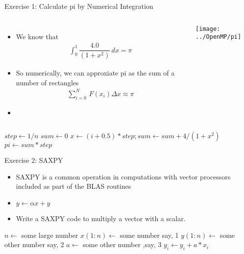 \documentclass[c,mathserif,compress,xcolor=svgnames]{beamer}
\begin{document}
\setcounter{algorithm}{0}
\begin{frame}[allowframebreaks]{Exercise 1: Calculate pi by Numerical Integration}
  \begin{columns}
    \column{5cm}
    \begin{itemize}
      \item We know that
      \begin{align*}
        \int^1_0 \dfrac{4.0}{(1+x^2)}\, dx = \pi
      \end{align*}
      \item So numerically, we can approxiate pi as the sum of a number of rectangles
      \begin{align*}
        \sum^N_{i=0}\,F(x_i)\Delta x \approx \pi
      \end{align*}
      \item[] 
    \end{itemize}
    \column{5cm}
    \begin{center}
      \texttt{[image: ../OpenMP/pi]}
    \end{center}
  \end{columns}

  \begin{algorithm}[H]
    \caption{Pseudo Code for Calculating Pi}
    \begin{algorithmic}
        \State $step \gets 1/n$
        \State $sum \gets 0$
        \State $x \gets (i+0.5)*step; sum \gets sum + 4/(1+x^2)$
        \EndDo
        \State $pi \gets sum * step$
        \EndFunction
    \end{algorithmic}
  \end{algorithm}
\end{frame}

\begin{frame}{Exercise 2: SAXPY}
  \begin{itemize}
    \item SAXPY is a common operation in computations with vector processors included as part of the BLAS routines
    \item[] $y\leftarrow \alpha x + y$
    \item Write a SAXPY code to multiply a vector with a scalar.
  \end{itemize}
  \begin{algorithm}[H]
    \caption{Pseudo Code for SAXPY}
    \begin{algorithmic}
      \State $n \gets$ some large number
      \State $x(1:n) \gets$ some number say, 1
      \State $y(1:n) \gets$ some other number say, 2
      \State $a \gets$ some other number ,say, 3
      \State $y_i \gets y_i + a * x_i$
      \EndDo
    \end{algorithmic}
  \end{algorithm}
\end{frame}
\end{document}

